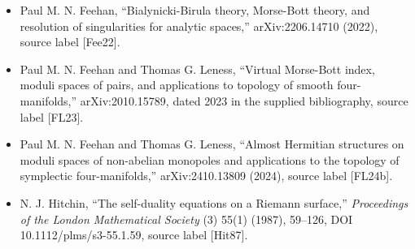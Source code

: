 \documentclass[11pt]{article}
\begin{document}
\begin{itemize}
\item Paul M. N. Feehan, ``Bialynicki-Birula theory, Morse-Bott theory, and resolution of singularities for analytic spaces,'' arXiv:2206.14710 (2022), source label [Fee22].
\item Paul M. N. Feehan and Thomas G. Leness, ``Virtual Morse-Bott index, moduli spaces of pairs, and applications to topology of smooth four-manifolds,'' arXiv:2010.15789, dated 2023 in the supplied bibliography, source label [FL23].
\item Paul M. N. Feehan and Thomas G. Leness, ``Almost Hermitian structures on moduli spaces of non-abelian monopoles and applications to the topology of symplectic four-manifolds,'' arXiv:2410.13809 (2024), source label [FL24b].
\item N. J. Hitchin, ``The self-duality equations on a Riemann surface,'' \emph{Proceedings of the London Mathematical Society} (3) 55(1) (1987), 59--126, DOI 10.1112/plms/s3-55.1.59, source label [Hit87].
\end{itemize}
\end{document}
